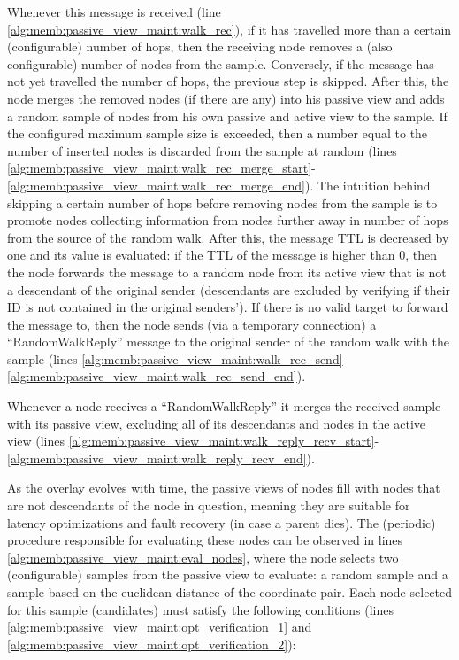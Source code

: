 

Whenever this message is received (line \ref{alg:memb:passive_view_maint:walk_rec}), if it has travelled more than a certain (configurable) number of hops, then the receiving node removes a (also configurable) number of nodes from the sample. Conversely, if the message has not yet travelled the number of hops, the previous step is skipped. After this, the node merges the removed nodes (if there are any) into his passive view and adds a random sample of nodes from his own passive and active view to the sample. If the configured maximum sample size is exceeded, then a number equal to the number of inserted nodes is discarded from the sample at random (lines \ref{alg:memb:passive_view_maint:walk_rec_merge_start}-\ref{alg:memb:passive_view_maint:walk_rec_merge_end}). The intuition behind skipping a certain number of hops before removing nodes from the sample is to promote nodes collecting information from nodes further away in number of hops from the source of the random walk. After this, the message TTL is decreased by one and its value is evaluated: if the TTL of the message is higher than 0, then the node forwards the message to a random node from its active view that is not a descendant of the original sender (descendants are excluded by verifying if their ID is not contained in the original senders'). If there is no valid target to forward the message to, then the node sends (via a temporary connection) a ``RandomWalkReply'' message to the original sender of the random walk with the sample (lines \ref{alg:memb:passive_view_maint:walk_rec_send}-\ref{alg:memb:passive_view_maint:walk_rec_send_end}). 

Whenever a node receives a ``RandomWalkReply'' it merges the received sample with its passive view, excluding all of its descendants and nodes in the active view (lines \ref{alg:memb:passive_view_maint:walk_reply_recv_start}-\ref{alg:memb:passive_view_maint:walk_reply_recv_end}).

As the overlay evolves with time, the passive views of nodes fill with nodes that are not descendants of the node in question, meaning they are suitable for latency optimizations and fault recovery (in case a parent dies). The (periodic) procedure responsible for evaluating these nodes can be observed in lines \ref{alg:memb:passive_view_maint:eval_nodes}, where the node selects two (configurable) samples from the passive view to evaluate: a random sample and a sample based on the euclidean distance of the coordinate pair. Each node selected for this sample (candidates) must satisfy the following conditions (lines \ref{alg:memb:passive_view_maint:opt_verification_1} and \ref{alg:memb:passive_view_maint:opt_verification_2}): 

